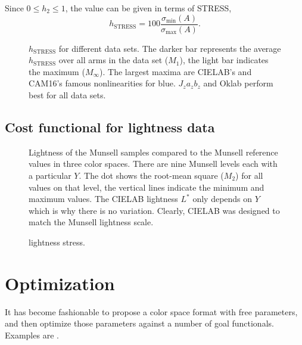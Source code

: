 \documentclass{scrartcl}
\newtheorem*{remark}{Remark}
\theoremstyle{named}
\begin{document}
Since $0\le h_2\le 1$, the value can be given in terms of STRESS,
\begin{equation}\label{eq:hstress}
  h_\text{STRESS} = 100 \frac{\sigma_{\min}(A)}{\sigma_{\max}(A)}.
\end{equation}




\begin{figure}
  \centering
  
  \caption{$h_\text{STRESS}$ for different data sets. The darker bar represents the
  average $h_\text{STRESS}$ over all arms in the data set ($M_1$), the light bar
  indicates the maximum ($M_{\infty}$).  The largest maxima are CIELAB's and CAM16's
  famous nonlinearities for blue.
  $J_za_zb_z$ and Oklab perform best for all data sets.}
  \label{fig:hstress}
\end{figure}

\subsection{Cost functional for lightness data}

\begin{figure}
  \centering
  
  \hfill
  
  \hfill
  
  \caption{Lightness of the Munsell samples compared to the Munsell reference values in
  three color spaces.
  There are nine Munsell levels each with a particular $Y$.
  The dot shows the root-mean square ($M_2$) for all values on that level, the
  vertical lines indicate the minimum and maximum values.
  The CIELAB lightness $L^*$ only depends on $Y$ which is why there is no variation.
  Clearly, CIELAB was designed to match the Munsell lightness scale.}
\end{figure}

\begin{figure}
  \centering
  
  \caption{lightness stress.}
\end{figure}


\cite{munsell}
\cite{fairchildchen}

\section{Optimization}

It has become fashionable to propose a color space format with free parameters, and then
optimize those parameters against a number of goal functionals. Examples are
\cite{prolab,oklab,jzazbz}.


{}

\end{document}

